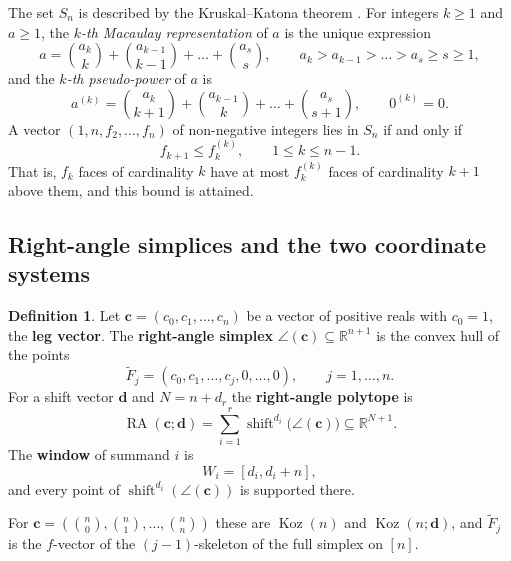 \documentclass[11pt, a4paper, abstract=yes]{scrartcl}
\theoremstyle{definition}
\newtheorem{definition}{Definition}
\theoremstyle{remark}
\theoremstyle{plain}
\newcommand{\vek}[1]{\boldsymbol{#1}}
\theoremstyle{remark}
\theoremstyle{plain}
\newcommand{\Koz}{\operatorname{Koz}}
\newcommand{\shift}{\operatorname{shift}}
\newcommand{\rasimp}{\angle}
\newcommand{\RA}{\operatorname{RA}}
\begin{document}
The set \(S_n\) is described by the Kruskal--Katona theorem \autocite{Kruskal1963,Katona1968}. For
integers \(k\ge1\) and \(a\ge1\), the \emph{\(k\)-th Macaulay representation} of \(a\) is the unique
expression
\begin{equation}\label{eq:macaulay}
  a=\binom{a_k}k+\binom{a_{k-1}}{k-1}+\dots+\binom{a_s}s,\qquad a_k>a_{k-1}>\dots>a_s\ge s\ge1,
\end{equation}
and the \emph{\(k\)-th pseudo-power} of \(a\) is
\begin{equation}\label{eq:kk}
  a^{(k)}=\binom{a_k}{k+1}+\binom{a_{k-1}}{k}+\dots+\binom{a_s}{s+1},\qquad 0^{(k)}=0 .
\end{equation}
A vector \((1,n,f_2,\dots,f_n)\) of non-negative integers lies in \(S_n\) if and only if
\begin{equation}\label{eq:kk-cond}
  f_{k+1}\le f_k^{(k)},\qquad 1\le k\le n-1 .
\end{equation}
That is, \(f_k\) faces of cardinality \(k\) have at most \(f_k^{(k)}\) faces of cardinality \(k+1\)
above them, and this bound is attained.
\subsection{Right-angle simplices and the two coordinate systems}
\label{sec:orgb963779}

\begin{definition}
Let \(\vek c=(c_0,c_1,\dots,c_n)\) be a vector of positive reals with \(c_0=1\), the \textbf{leg vector}. The
\textbf{right-angle simplex} \(\rasimp(\vek c)\subseteq\mathbb R^{n+1}\) is the convex hull of the points
\begin{equation}\label{eq:Ftilde}
  \tilde F_j=(c_0,c_1,\dots,c_j,0,\dots,0),\qquad j=1,\dots,n .
\end{equation}
For a shift vector \(\vek d\) and
\(N=n+d_r\) the \textbf{right-angle polytope} is
\begin{equation}\label{eq:ra}
  \RA(\vek c;\vek d)=\sum_{i=1}^r\shift^{d_i}\bigl(\rasimp(\vek c)\bigr)\subseteq\mathbb R^{N+1} .
\end{equation}
The \textbf{window} of summand \(i\) is
\begin{equation}\label{eq:window}
  W_i=[d_i,d_i+n] ,
\end{equation}
and every point of \(\shift^{d_i}(\rasimp(\vek c))\) is supported there.
\label{def-ra}
\end{definition}

For \(\vek c=(\binom n0,\binom n1,\dots,\binom nn)\) these are \(\Koz(n)\) and \(\Koz(n;\vek d)\), and
\(\tilde F_j\) is the \(f\)-vector of the \((j-1)\)-skeleton of the full simplex on \([n]\).
\end{document}
